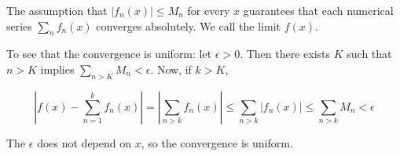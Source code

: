 \documentclass[12pt]{article}
\begin{document}
The assumption that $|f_n(x)| \le M_n$ for every $x$ guarantees that each numerical series $\sum_n f_n(x)$ converges absolutely. We call the limit $f(x)$.

To see that the convergence is uniform: let $\epsilon>0$. Then there exists $K$ such that $n>K$ implies $\sum_{n>K} M_n < \epsilon$. Now, if $k>K$,

\[
|f(x)-\sum_{n=1}^k f_n(x)| = |\sum_{n>k} f_n(x) | \le
\sum_{n>k} |f_n(x)| \le \sum_{n>k} M_n < \epsilon
\]

The $\epsilon$ does not depend on $x$, so the convergence is uniform.


\end{document}
